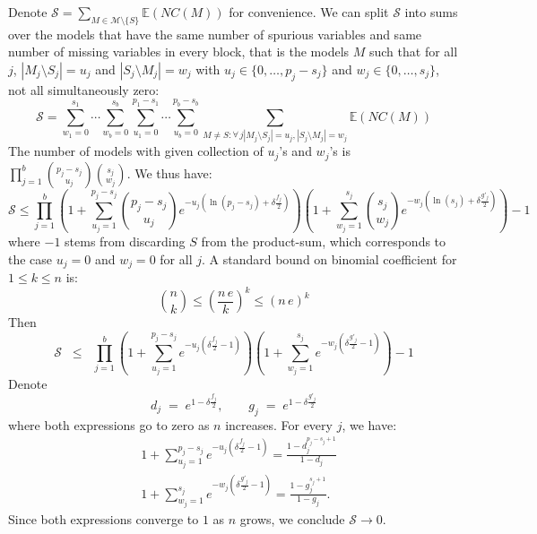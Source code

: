 \documentclass[aos]{imsart}
\theoremstyle{plain}
\newcommand{\E}{\mathbb{E}}
\newcommand{\M}{\mathcal{M}}
\begin{document}
Denote $\mathcal{S}= \sum_{M \in \M\setminus \{S\}} \E\left(NC(M)\right)$ for convenience. We can split $\mathcal{S}$ into sums over the models that have the same number of spurious variables and same number of missing variables in every block, that is the models $M$ such that for all $j$, $|M_j\setminus S_j|=u_j$ and $|S_j\setminus M_j|=w_j$ with $u_j \in \{0,\ldots,p_j-s_j\}$ and $w_j \in \{0,\ldots,s_j\}$, not all simultaneously zero:
$$\mathcal{S} =\sum_{w_1=0}^{s_1}\cdots\sum_{w_b=0}^{s_b}\sum_{u_1=0}^{p_1-s_1}\cdots\sum_{u_b=0}^{p_b-s_b}\sum_{M \neq S:\forall \,j |M_j\setminus S_j|=u_j, |S_j\setminus M_j|=w_j } \E\left(NC(M)\right)$$
The number of models with given collection of $u_j$'s and $w_j$'s is $\prod_{j=1}^b {\binom{p_j-s_j}{u_j}}{\binom{s_j}{w_j}}$. We thus have:
\begin{equation*}
    \mathcal{S} \leq \prod_{j=1}^b\left(1+\sum_{u_j=1}^{p_j-s_j}{\binom{p_j-s_j}{u_j}}e^{- u_j(\ln(p_j-s_j)+\delta \tfrac{f_j}{2})}\right)\left(1+
    \sum_{w_j=1}^{s_j}{\binom{s_j}{w_j}}
    e^{-w_j(\ln(s_j)+\delta \tfrac{g'_j}{2})}\right) - 1
\end{equation*}
where $-1$ stems from discarding $S$ from the product-sum, which corresponds to the case $u_j=0$ and $w_j=0$ for all $j$. A standard bound on binomial coefficient for $1\leq k\leq n$ is:
\begin{equation}\label{eq:upperboudbinom}
    \binom{n}{k} \leq \left(\frac{n\,e}{k}\right)^k \leq \left(n\,e\right)^k
\end{equation}
Then
\begin{equation*}
    \mathcal{S} \;\;\leq\;\; \prod_{j=1}^b\left(1+\sum_{u_j=1}^{p_j-s_j}e^{-u_j\left(\delta \tfrac{f_j}{2}-1\right)}\right)\left(1+
    \sum_{w_j=1}^{s_j}    e^{-w_j\left(\delta \tfrac{g'_j}{2}-1\right)}\right) - 1
\end{equation*}
Denote
$$
d_j\;=\;e^{1-\delta \tfrac{f_j}{2}},\qquad g_j\;=\;e^{1-\delta \tfrac{g'_j}{2}}
$$
where both expressions go to zero as $n$ increases.
For every $j$, we have:
\begin{eqnarray*}
    &1+\sum_{u_j=1}^{p_j-s_j}e^{-u_j\left(\delta \tfrac{f_j}{2}-1\right)}
    =\frac{1-d_j^{p_j-s_j+1}}{1-d_j} \\
    &1+\sum_{w_j=1}^{s_j}    e^{-w_j\left(\delta \tfrac{g'_j}{2}-1\right)} =\frac{1-g_j^{s_j+1}}{1-g_j}.
\end{eqnarray*}
Since both expressions converge to $1$ as $n$ grows, we conclude $\mathcal S\to 0$.
\end{document}

